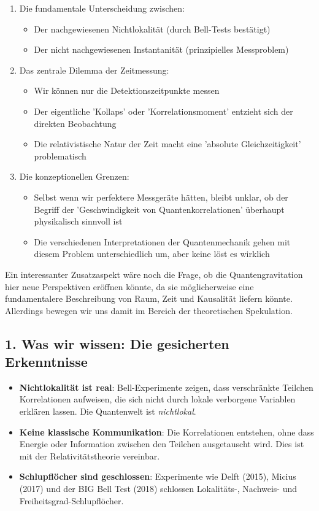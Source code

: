\documentclass[12pt,a4paper]{article}
\begin{document}
\begin{enumerate}
    \item Die fundamentale Unterscheidung zwischen:
    \begin{itemize}
        \item Der nachgewiesenen Nichtlokalität (durch Bell-Tests bestätigt)
        \item Der nicht nachgewiesenen Instantanität (prinzipielles Messproblem)
    \end{itemize}
    \item Das zentrale Dilemma der Zeitmessung:
    \begin{itemize}
        \item Wir können nur die Detektionszeitpunkte messen
        \item Der eigentliche 'Kollaps' oder 'Korrelationsmoment' entzieht sich der direkten Beobachtung
        \item Die relativistische Natur der Zeit macht eine 'absolute Gleichzeitigkeit' problematisch
    \end{itemize}
    \item Die konzeptionellen Grenzen:
    \begin{itemize}
        \item Selbst wenn wir perfektere Messgeräte hätten, bleibt unklar, ob der Begriff der 'Geschwindigkeit von Quantenkorrelationen' überhaupt physikalisch sinnvoll ist
        \item Die verschiedenen Interpretationen der Quantenmechanik gehen mit diesem Problem unterschiedlich um, aber keine löst es wirklich
    \end{itemize}
\end{enumerate}

Ein interessanter Zusatzaspekt wäre noch die Frage, ob die Quantengravitation hier neue Perspektiven eröffnen könnte, da sie möglicherweise eine fundamentalere Beschreibung von Raum, Zeit und Kausalität liefern könnte. Allerdings bewegen wir uns damit im Bereich der theoretischen Spekulation.

\subsection{1. Was wir wissen: Die gesicherten Erkenntnisse}
\begin{itemize}
    \item \textbf{Nichtlokalität ist real}: Bell-Experimente zeigen, dass verschränkte Teilchen Korrelationen aufweisen, die sich nicht durch lokale verborgene Variablen erklären lassen. Die Quantenwelt ist \textit{nichtlokal}.
    \item \textbf{Keine klassische Kommunikation}: Die Korrelationen entstehen, ohne dass Energie oder Information zwischen den Teilchen ausgetauscht wird. Dies ist mit der Relativitätstheorie vereinbar.
    \item \textbf{Schlupflöcher sind geschlossen}: Experimente wie Delft (2015), Micius (2017) und der BIG Bell Test (2018) schlossen Lokalitäts-, Nachweis- und Freiheitsgrad-Schlupflöcher.
\end{itemize}
\end{document}
